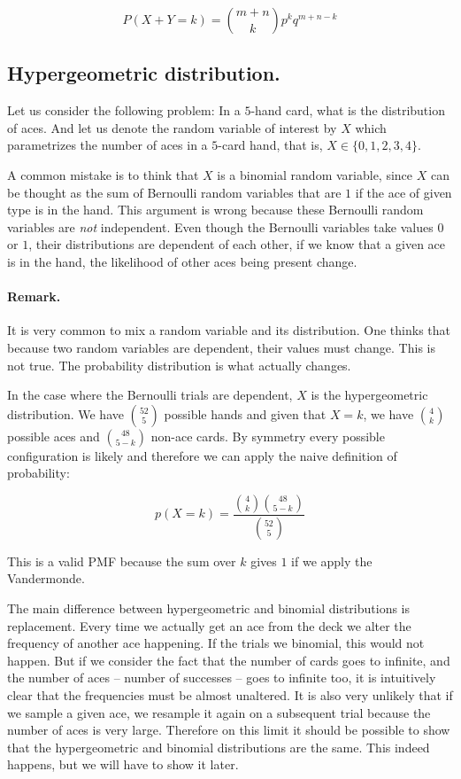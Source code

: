 \documentclass[12pt]{article}
\begin{document}
\begin{equation}
P(X + Y = k) = 
{m + n \choose k} p^{k} q^{m + n - k}
\end{equation}

\subsection{Hypergeometric distribution.}

Let us consider the following problem:
In a $5$-hand card, what is the distribution of aces.
And let us denote the random variable of interest by $X$ which
parametrizes the number of aces in a $5$-card hand, that is,
$X \in \{0, 1, 2, 3, 4\}$.

A common mistake is to think that $X$ is a binomial random variable,
since $X$ can be thought as the sum of Bernoulli random variables 
that are $1$ if the ace of given type is in the hand.
This argument is wrong because these Bernoulli random variables are
\textit{not} independent. Even though the Bernoulli variables take values
$0$ or $1$, their distributions are dependent of each other, if we know that a given
ace is in the hand, the likelihood of other aces being present change.

\paragraph{Remark.}
It is very common to mix a random variable and its distribution.
One thinks that because two random variables are dependent, their values must change.
This is not true. The probability distribution is what actually changes.

\vspace{.5cm}
In the case where the Bernoulli trials are dependent, 
$X$ is the hypergeometric distribution.
We have $52\choose{5}$ possible hands and given that $X = k$,
we have ${4 \choose k}$ possible aces and ${48 \choose 5 - k}$
non-ace cards.
By symmetry every possible configuration is likely and therefore
we can apply the naive definition of probability:

\begin{equation}
p(X = k) = 
\frac{ {4 \choose k} {48 \choose 5 - k} }
{ {52 \choose 5} }
\end{equation}

\noindent
This is a valid PMF because the sum over $k$ gives $1$ if we apply the 
Vandermonde.

The main difference between hypergeometric and binomial distributions
is replacement. Every time we actually get an ace from the deck we alter the 
frequency of another ace happening. If the trials we binomial, this would not 
happen. But if we consider the fact that the number of cards goes to infinite,
and the number of aces -- number of successes -- goes to infinite too,
it is intuitively clear that the frequencies must be almost unaltered.
It is also very unlikely that if we sample a given ace, we resample it again
on a subsequent trial because the number of aces is very large.
Therefore on this limit it should be possible to show that the hypergeometric
and binomial distributions are the same.
This indeed happens, but we will have to show it later.
\end{document}
